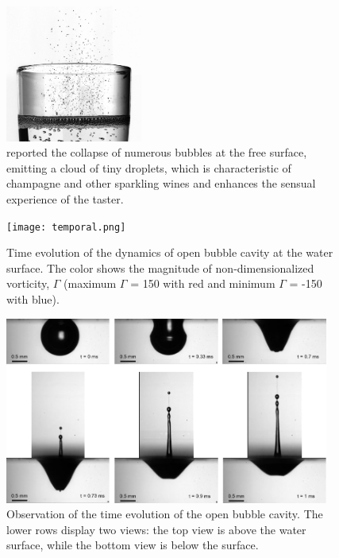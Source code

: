 \documentclass[a4paper,10pt]{article}
\begin{document}
\begin{figure}[H]
	\begin{center}
		\includegraphics[width=0.4\textwidth]{champagne.jpg}
		\caption{\citet{ghabache2016evaporation} reported the collapse of numerous bubbles at the free surface, emitting a cloud of tiny droplets, which is characteristic of champagne and other sparkling wines and enhances the sensual experience of the taster.}
		\label{fig:champange}
	\end{center}
\end{figure}

\begin{figure}[H]
\begin{center}
 \texttt{[image: temporal.png]}
 \caption{Time evolution of the dynamics of open bubble cavity at the water surface. The color shows the magnitude of non-dimensionalized vorticity, $\Gamma$ (maximum $\Gamma$ = 150 with red and minimum $\Gamma$ = -150 with blue).}
 \label{Figure::Typical}
\end{center}
\end{figure}


\begin{figure}[H]
\begin{center}
 \includegraphics[width=0.95\textwidth]{schematic.pdf}
 \caption{Observation of the time evolution of the open bubble cavity. The lower rows display two views: the top view is above the water surface, while the bottom view is below the surface. }
 \label{Figure::Waves}
\end{center}
\end{figure}
\end{document}
